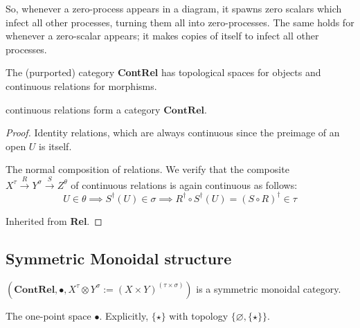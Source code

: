 \begin{marginfigure}
\centering
{}
\caption{So, whenever a zero-process appears in a diagram, it spawns zero scalars which infect all other processes, turning them all into zero-processes. The same holds for whenever a zero-scalar appears; it makes copies of itself to infect all other processes.}
\end{marginfigure}

\begin{defn}
The (purported) category \textbf{ContRel} has topological spaces for objects and continuous relations for morphisms.
\end{defn}

\begin{proposition}
continuous relations form a category $\mathbf{ContRel}$.
\begin{proof}
 Identity relations, which are always continuous since the preimage of an open $U$ is itself.

 The normal composition of relations. We verify that the composite $X^\tau \overset{R}{\rightarrow} Y^\sigma \overset{S}{\rightarrow} Z^\theta$ of continuous relations is again continuous as follows:
\[U \in \theta \implies S^\dag(U) \in \sigma \implies R^\dag \circ S^\dag(U) = (S \circ R)^\dag \in \tau\]

 Inherited from \textbf{Rel}.
\end{proof}
\end{proposition}

\subsection{Symmetric Monoidal structure}

\begin{proposition}
$(\mathbf{ContRel},\bullet,X^\tau \otimes Y^\sigma := (X \times Y)^{(\tau \times \sigma)})$ is a symmetric monoidal category.
\end{proposition}

 The one-point space $\bullet$. Explicitly, $\{\star\}$ with topology $\{\varnothing,\{\star\}\}$.

